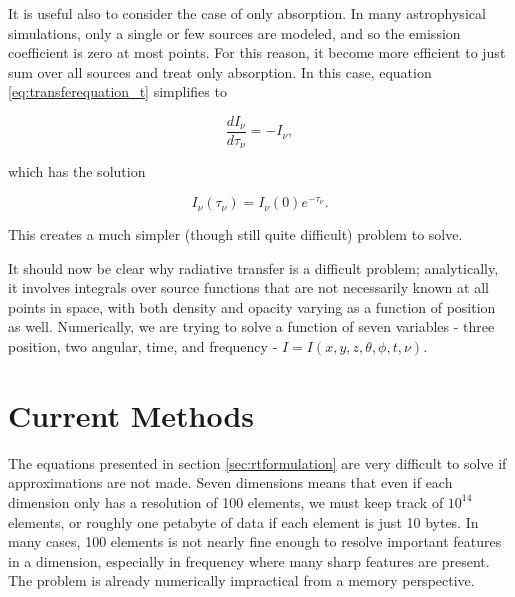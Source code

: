 It is useful also to consider the case of only absorption. In many astrophysical simulations, only a single or few sources are modeled, and so the emission coefficient is zero at most points. For this reason, it become more efficient to just sum over all sources and treat only absorption. In this case, equation \ref{eq:transferequation_t} simplifies to

\begin{equation}
\label{eq:transferequation_abs}
\frac{dI_{\nu}}{d\tau_{\nu}} = -I_{\nu},
\end{equation}

which has the solution

\begin{equation}
\label{eq:absorptionsolution}
I_{\nu}(\tau_{\nu}) = I_{\nu}(0)e^{-\tau_{\nu}}.
\end{equation}

This creates a much simpler (though still quite difficult) problem to solve.

It should now be clear why radiative transfer is a difficult problem; analytically, it involves integrals over source functions that are not necessarily known at all points in space, with both density and opacity varying as a function of position as well. Numerically, we are trying to solve a function of seven variables - three position, two angular, time, and frequency - $I = I(x,y,z,\theta,\phi,t,\nu)$.

%

\section{Current Methods}
\label{sec:currentmethods}

The equations presented in section \ref{sec:rtformulation} are very difficult to solve if approximations are not made. Seven dimensions means that even if each dimension only has a resolution of 100 elements, we must keep track of $10^{14}$ elements, or roughly one petabyte of data if each element is just 10 bytes. In many cases, 100 elements is not nearly fine enough to resolve important features in a dimension, especially in frequency where many sharp features are present. The problem is already numerically impractical from a memory perspective.

